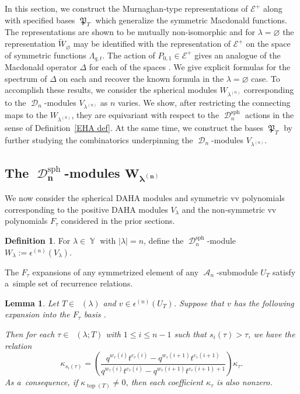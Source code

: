 \documentclass[10pt,a4paper]{amsart}
\numberwithin{equation}{section}
\newtheorem{Lemma}[Theorem]{Lemma}
\theoremstyle{definition}
\newtheorem{Definition}[Theorem]{Definition}
\DeclareMathOperator{\Par}{\mathbb{Y}}
\DeclareMathOperator{\PSYT}{\mathrm{PSYT}_{\geq 0}}
\DeclareMathOperator{\RSSYT}{\mathrm{RSSYT}_{\geq 0}}
\DeclareMathOperator{\sA}{\mathscr{A}}
\DeclareMathOperator{\sD}{\mathscr{D}}
\DeclareMathOperator{\MacD}{\mathfrak{P}}
\DeclareMathOperator{\Top}{\mathrm{top}}
\begin{document}
In this section, we construct the Murnaghan-type representations  of $\mathcal{E}^+$ along with specified bases $\MacD_{T}$ which generalize the symmetric Macdonald functions. The representations  are shown to be mutually non-isomorphic and for $\lambda = \varnothing$ the representation $\widetilde{W}_{\varnothing}$ may be identified with the representation of $\mathcal{E}^+$ on the space of symmetric functions $\Lambda_{q,t}$. The action of $P_{0,1} \in \mathcal{E}^+$ gives an analogue of the Macdonald operator $\Delta$ for each of the spaces . We give explicit formulas for the spectrum of $\Delta$ on each  and recover the known formula in the $\lambda = \varnothing$ case. To accomplish these results, we consider the spherical modules $W_{\lambda^{(n)}}$ corresponding to the $\sD_n$-modules $V_{\lambda^{(n)}}$ as $n$ varies. We show, after restricting the connecting maps  to the $W_{\lambda^{(n)}}$, they are equivariant with respect to the $\sD_n^{\mathrm{sph}}$ actions in the sense of Definition~\ref{EHA def}. At the same time, we construct the bases $\MacD_{T}$ by further studying the combinatorics underpinning the $\sD_n$-modules $V_{\lambda^{(n)}}$.

\subsection[The D\_n\^{}sph-modules W\_lambda\^{}(n)]{The $\boldsymbol{\sD_n^{\mathrm{sph}}}$-modules $\boldsymbol{W_{\lambda^{(n)}}}$}

We now consider the spherical DAHA modules and symmetric vv polynomials corresponding to the positive DAHA modules $V_{\lambda}$ and the non-symmetric vv polynomials $F_{\tau}$ considered in the prior sections.
 \begin{Definition}\label{sph DAHA reps Definition}
 For $\lambda \in \Par$ with $|\lambda| = n$, define the $\sD_n^{\mathrm{sph}}$-module $W_{\lambda}:= \epsilon^{(n)}(V_{\lambda})$.
 \end{Definition}

 The $F_{\tau}$ expansions of any symmetrized element of any $\sA_n$-submodule $U_{T}$ satisfy a~simple set of recurrence relations.

\begin{Lemma}\label{coefficient relations for sym element}
 Let $T \in \RSSYT(\lambda)$ and $v \in \epsilon^{(n)}(U_T)$. Suppose that $v$ has the following expansion into the $F_{\tau}$ basis
 \smash{$
 v = \sum_{\tau \in \PSYT(\lambda;T)} \kappa_{\tau}F_{\tau}$}.

 Then for each $\tau \in \PSYT(\lambda;T)$ with $1\leq i \leq n-1$ such that $s_i(\tau) > \tau$, we have the relation
 \[
 \kappa_{s_i(\tau)} = \left( \frac{q^{w_{\tau}(i)}t^{c_{\tau}(i)} - q^{w_{\tau}(i+1)}t^{c_{\tau}(i+1)}}{q^{w_{\tau}(i)}t^{c_{\tau}(i)} - q^{w_{\tau}(i+1)}t^{c_{\tau}(i+1)+1}} \right) \kappa_{\tau}.
 \]
 As a~consequence, if $\kappa_{\Top(T)} \neq 0$, then each coefficient $\kappa_{\tau}$ is also nonzero.
\end{Lemma}
\end{document}
